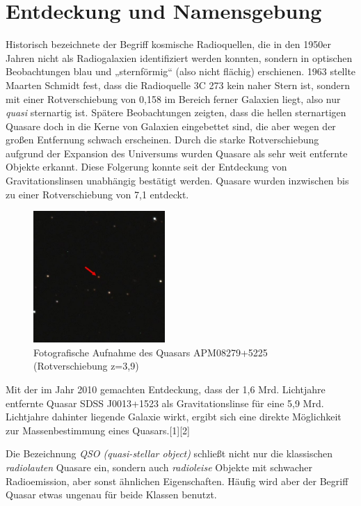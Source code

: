 
\chapter{Entdeckung und Namensgebung}
\label{chapter-kapitel1}

Historisch bezeichnete der Begriff kosmische Radioquellen, die in den 1950er Jahren nicht als Radiogalaxien identifiziert werden konnten, sondern in optischen Beobachtungen blau und „sternförmig“ (also nicht flächig) erschienen. 1963 stellte Maarten Schmidt fest, dass die Radioquelle 3C 273 kein naher Stern ist, sondern mit einer Rotverschiebung von 0,158 im Bereich ferner Galaxien liegt, also nur \textit{quasi} sternartig ist. Spätere Beobachtungen zeigten, dass die hellen sternartigen Quasare doch in die Kerne von Galaxien eingebettet sind, die aber wegen der großen Entfernung schwach erscheinen. Durch die starke Rotverschiebung aufgrund der Expansion des Universums wurden Quasare als sehr weit entfernte Objekte erkannt. Diese Folgerung konnte seit der Entdeckung von Gravitationslinsen unabhängig bestätigt werden. Quasare wurden inzwischen bis zu einer Rotverschiebung von 7,1 entdeckt.

\begin{figure}[h]
	\centering
	\includegraphics[width=5cm]{Imgs/QSO_APM_08279+5225_marked}
	\caption{Fotografische Aufnahme des Quasars APM08279+5225\\\hspace*{3cm}(Rotverschiebung z=3,9)\cite{wikiQuasar2}}
	\label{fig:darstQuasar}
\end{figure}

Mit der im Jahr 2010 gemachten Entdeckung, dass der 1,6 Mrd. Lichtjahre entfernte Quasar SDSS J0013+1523 als Gravitationslinse für eine 5,9 Mrd. Lichtjahre dahinter liegende Galaxie wirkt, ergibt sich eine direkte Möglichkeit zur Massenbestimmung eines Quasars.[1][2]

Die Bezeichnung \textit{QSO (quasi-stellar object)} schließt nicht nur die klassischen \textit{radiolauten} Quasare ein, sondern auch \textit{radioleise} Objekte mit schwacher Radioemission, aber sonst ähnlichen Eigenschaften. Häufig wird aber der Begriff Quasar etwas ungenau für beide Klassen benutzt.